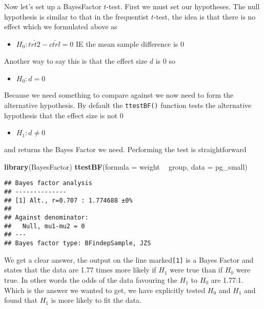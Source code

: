 \documentclass[
]{book}
\newenvironment{Shaded}{\begin{snugshade}}{\end{snugshade}}
\newcommand{\DataTypeTok}[1]{\textcolor[rgb]{0.13,0.29,0.53}{#1}}
\newcommand{\KeywordTok}[1]{\textcolor[rgb]{0.13,0.29,0.53}{\textbf{#1}}}
\newcommand{\NormalTok}[1]{#1}
\newcommand{\OperatorTok}[1]{\textcolor[rgb]{0.81,0.36,0.00}{\textbf{#1}}}
\newcommand{\StringTok}[1]{\textcolor[rgb]{0.31,0.60,0.02}{#1}}
\providecommand{\tightlist}{%
  \setlength{\itemsep}{0pt}\setlength{\parskip}{0pt}}
\begin{document}
Now let's set up a BayesFactor \(t\)-test. First we must set our hypotheses. The null hypothesis is similar to that in the frequentist \(t\)-test, the idea is that there is no effect which we formulated above as

\begin{itemize}
\tightlist
\item
  \(H_0 : \bar{trt2} - \bar{ctrl} = 0\) IE the mean sample difference is 0
\end{itemize}

Another way to say this is that the effect size \(d\) is 0 so

\begin{itemize}
\tightlist
\item
  \(H_0 : d = 0\)
\end{itemize}

Because we need something to compare against we now need to form the alternative hypothesis. By default the \texttt{ttestBF()} function tests the alternative hypothesis that the effect size is not 0

\begin{itemize}
\tightlist
\item
  \(H_1 : d \neq 0\)
\end{itemize}

and returns the Bayes Factor we need. Performing the test is straightforward

\begin{Shaded}
\begin{Highlighting}[]
\KeywordTok{library}\NormalTok{(BayesFactor)}
\KeywordTok{ttestBF}\NormalTok{(}\DataTypeTok{formula =}\NormalTok{  weight }\OperatorTok{~}\StringTok{ }\NormalTok{group, }\DataTypeTok{data =}\NormalTok{ pg_small)}
\end{Highlighting}
\end{Shaded}

\begin{verbatim}
## Bayes factor analysis
## --------------
## [1] Alt., r=0.707 : 1.774688 ±0%
## 
## Against denominator:
##   Null, mu1-mu2 = 0 
## ---
## Bayes factor type: BFindepSample, JZS
\end{verbatim}

We get a clear answer, the output on the line marked\texttt{{[}1{]}} is a Bayes Factor and states that the data are 1.77 times more likely if \(H_1\) were true than if \(H_0\) were true. In other words the odds of the data favouring the \(H_1\) to \(H_0\) are 1.77:1. Which is the answer we wanted to get, we have explicitly tested \(H_0\) and \(H_1\) and found that \(H_1\) is more likely to fit the data.
\end{document}
